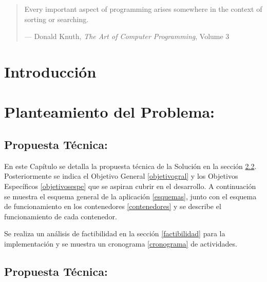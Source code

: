 \documentclass[
  10,
  openany]{book}
\begin{document}
\newpage
\thispagestyle{empty}
\vspace*{5cm}
\hspace*{2cm}
\begin{quote}
Every important aspect of programming arises somewhere in the context of sorting or searching.

--- Donald Knuth, \textit{The Art of Computer Programming}, Volume 3
\end{quote}
\thispagestyle{empty}
\maketitle



{
\setcounter{tocdepth}{3}
\tableofcontents
}
\listoffigures
\listoftables
\clearpage
{}

\hypertarget{introduccion}{%
\chapter{Introducción}\label{introduccion}}

\hypertarget{problema}{%
\chapter{Planteamiento del Problema:}\label{problema}}

\hypertarget{propuesta-tuxe9cnica}{%
\section{Propuesta Técnica:}\label{propuesta-tuxe9cnica}}

En este Capítulo se detalla la propuesta técnica de la Solución en la sección \ref{propuestatec}. Posteriormente se indica el Objetivo General \ref{objetivogral} y los Objetivos Específicos \ref{objetivosespe} que se aspiran cubrir en el desarrollo. A continuación se muestra el esquema general de la aplicación \ref{esquemas}, junto con el esquema de funcionamiento en los contenedores \ref{contenedores} y se describe el funcionamiento de cada contenedor.

Se realiza un análisis de factibilidad en la sección \ref{factibilidad} para la implementación y se muestra un cronograma \ref{cronograma} de actividades.

\hypertarget{propuestatec}{%
\section{Propuesta Técnica:}\label{propuestatec}}
\end{document}
